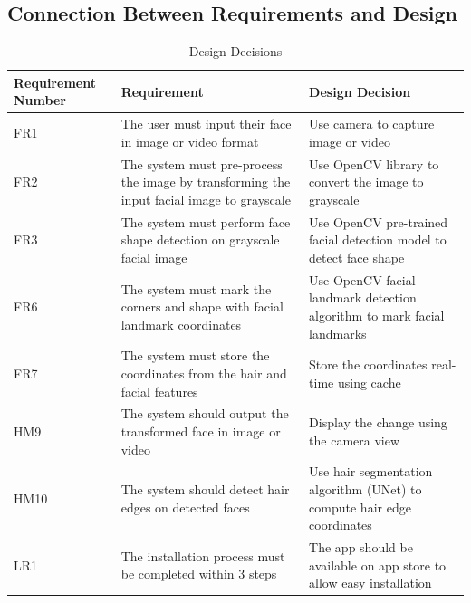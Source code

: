 \documentclass[12pt, titlepage]{article}
\begin{document}
\newpage
\subsection{Connection Between Requirements and Design} \label{SecConnection}

\begin{table}[h]
\caption{Design Decisions} \label{TblDecisions}
\begin{tabularx}{\textwidth}{p{2.5cm}p{6cm}X}
\toprule
\textbf{Requirement Number} & \textbf{Requirement} & \textbf{Design Decision}\\
\midrule
FR1 & The user must input their face in image or video format & Use camera to capture image or video\\
\midrule
FR2 & The system must pre-process the image by transforming the input facial image to grayscale & Use OpenCV library to convert the image to grayscale\\
\midrule
FR3 & The system must perform face shape detection on grayscale facial image & Use OpenCV pre-trained facial detection model to detect face shape\\
\midrule
FR6 & The system must mark the corners and shape with facial landmark coordinates & Use OpenCV facial landmark detection algorithm to mark facial landmarks\\
\midrule
FR7 & The system must store the coordinates from the hair and facial features & Store the coordinates real-time using cache\\
\midrule
HM9 & The system should output the transformed face in image or video & Display the change using the camera view\\
\midrule
HM10 & The system should detect hair edges on detected faces & Use hair segmentation algorithm (UNet) to compute hair edge coordinates\\
\midrule
LR1 & The installation process must be completed within 3 steps & The app should be available on app store to allow easy installation\\

\bottomrule
\end{tabularx}
\end{table}
\newpage
\end{document}
